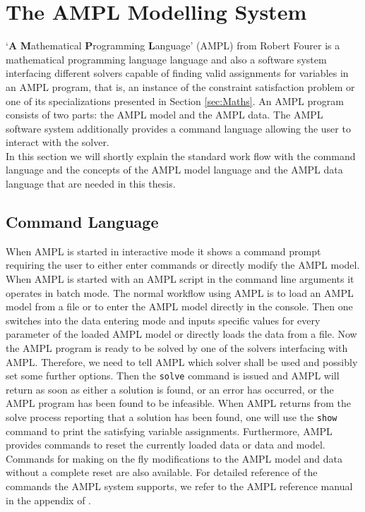 \section{The AMPL Modelling System}
\label{sec:AMPL}
`\textbf{A} \textbf{M}athematical \textbf{P}rogramming \textbf{L}anguage' (AMPL) from Robert Fourer \cite{AMPL} is a mathematical programming language language and also a software system interfacing different solvers capable of finding valid assignments for variables in an AMPL program, that is, an instance of the constraint satisfaction problem or one of its specializations presented in Section \ref{sec:Maths}.
An AMPL program consists of two parts: the AMPL model and the AMPL data. The AMPL software system additionally provides a command language allowing the user to interact with the solver.\\
 
In this section we will shortly explain the standard work flow with the command language and the concepts of the AMPL model language and the AMPL data language that are needed in this thesis.
\subsection{Command Language}
\label{sec:AMPLcommandLanguage}
When AMPL is started in interactive mode it shows a command prompt requiring the user to either enter commands or directly modify the AMPL model. When AMPL is started with an AMPL script in the command line arguments it operates in batch mode.
The normal workflow using AMPL is to load an AMPL model from a file or to enter the AMPL model directly in the console. Then one switches into the data entering mode and inputs specific values for every parameter of the loaded AMPL model or directly loads the data from a file. Now the AMPL program is ready to be solved by one of the solvers interfacing with AMPL. Therefore, we need to tell AMPL which solver shall be used and possibly set some further options. Then the \verb=solve= command is issued and AMPL will return as soon as either a solution is found, or an error has occurred, or the AMPL program has been found to be infeasible. When AMPL returns from the solve process reporting that a solution has been found, one will use the \verb=show= command to print the satisfying variable assignments.
Furthermore, AMPL provides commands to reset the currently loaded data or data and model. Commands for making on the fly modifications to the AMPL model and data without a complete reset are also available. For detailed reference of the commands the AMPL system supports, we refer to the AMPL reference manual in the appendix of \cite{AMPL}.
